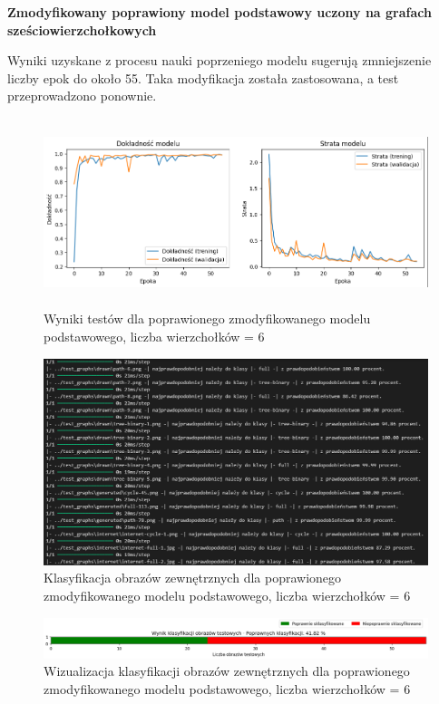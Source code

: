 \textbf{Zmodyfikowany poprawiony model podstawowy uczony na grafach sześciowierzchołkowych}

Wyniki uzyskane z procesu nauki poprzeniego modelu sugerują zmniejszenie liczby epok do około 55.
Taka modyfikacja została zastosowana, a test przeprowadzono ponownie.



\begin{figure}[ht]
	\centering
	\includegraphics[height=5.5cm]{resources/tests/images/v4/base6_1_1_img.png}
	\caption{Wyniki testów dla poprawionego zmodyfikowanego modelu podstawowego, liczba wierzchołków = 6}
	\label{Fig:tests-base-6a}
\end{figure}
\FloatBarrier


\begin{figure}[ht]
	\centering
	\includegraphics[width=14cm]{resources/tests/images/v4/base6_1_1_txt.png}
	\caption{Klasyfikacja obrazów zewnętrznych dla poprawionego zmodyfikowanego modelu podstawowego, liczba wierzchołków = 6}
	\label{Fig:tests-base-6b}
\end{figure}
\FloatBarrier

\begin{figure}[ht]
	\centering
	\includegraphics[width=14cm]{resources/tests/images/v4/base6_1_1_bar.png}
	\caption{Wizualizacja klasyfikacji obrazów zewnętrznych dla poprawionego zmodyfikowanego modelu podstawowego, liczba wierzchołków = 6}
	\label{Fig:tests-base-6c}
\end{figure}
\FloatBarrier

